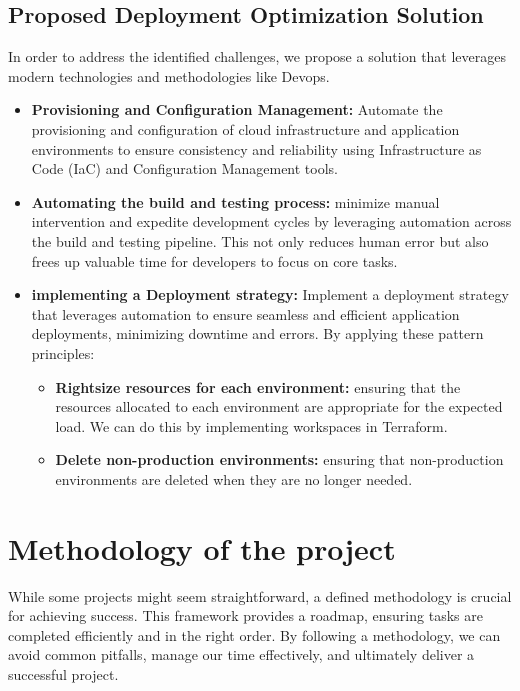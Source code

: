 \subsection{Proposed Deployment Optimization Solution}
In order to address the identified challenges, we propose a solution that leverages modern technologies and methodologies like Devops.
\begin{itemize}

    \item \textbf{Provisioning and Configuration Management:}
          Automate the provisioning and configuration of cloud infrastructure and application environments to ensure consistency and reliability using Infrastructure as Code (IaC) and Configuration Management tools.

    \item \textbf{Automating the build and testing process:}
          minimize manual intervention and expedite development cycles by leveraging automation across the build and testing pipeline. This not only reduces human error but also frees up valuable time for developers to focus on core tasks.
    \item \textbf{implementing a Deployment strategy:}
          Implement a deployment strategy that leverages automation to ensure seamless and efficient application deployments, minimizing downtime and errors. By applying these pattern principles:
          \begin{itemize}
              \item \textbf{Rightsize resources for each environment:} ensuring that the resources allocated to each environment are appropriate for the expected load. We can do this by implementing workspaces in Terraform.
              \item \textbf{Delete non-production environments:} ensuring that non-production environments are deleted when they are no longer needed.
          \end{itemize}
\end{itemize}

\section{Methodology of the project}
While some projects might seem straightforward, a defined methodology is crucial for achieving success.  This framework provides a roadmap, ensuring tasks are completed efficiently and in the right order. By following a methodology, we can avoid common pitfalls, manage our time effectively, and ultimately deliver a successful project.
